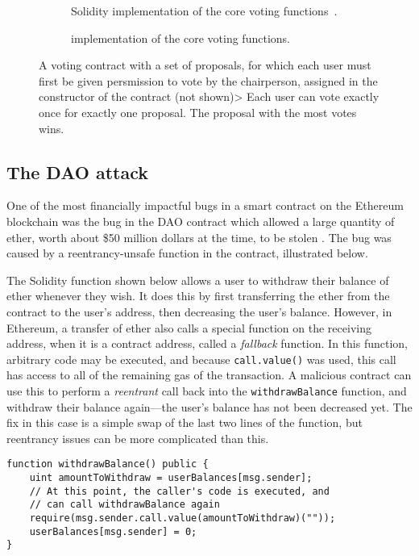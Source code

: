 \documentclass[dvipsnames, usenames, sigconf]{acmart}
\begin{document}
\begin{figure*}[h]
    \centering
    \begin{subfigure}[t]{0.49\textwidth}
        \centering
        
        \caption{Solidity implementation of the core voting functions~\cite{solidityByExample}.}
        \label{fig:voting-impl-sol}
    \end{subfigure}%
    \hfill
    \begin{subfigure}[t]{0.49\textwidth}
        \centering
        
        \caption{\langName implementation of the core voting functions.}
        \label{fig:voting-impl-flow}
    \end{subfigure}
    \caption{A voting contract with a set of proposals, for which each user must first be given persmission to vote by the chairperson, assigned in the constructor of the contract (not shown)>
    Each user can vote exactly once for exactly one proposal.
    The proposal with the most votes wins.}
    \label{fig:voting-impl}
\end{figure*}

\subsection{The DAO attack}
One of the most financially impactful bugs in a smart contract on the Ethereum blockchain was the bug in the DAO contract which allowed a large quantity of ether, worth about \$50 million dollars at the time, to be stolen .
The bug was caused by a reentrancy-unsafe function in the contract, illustrated below.

The Solidity function shown below allows a user to withdraw their balance of ether whenever they wish.
It does this by first transferring the ether from the contract to the user's address, then decreasing the user's balance.
However, in Ethereum, a transfer of ether also calls a special function on the receiving address, when it is a contract address, called a \emph{fallback} function.
In this function, arbitrary code may be executed, and because \lstinline{call.value()} was used, this call has access to all of the remaining gas of the transaction.
A malicious contract can use this to perform a \emph{reentrant} call back into the \lstinline{withdrawBalance} function, and withdraw their balance again---the user's balance has not been decreased yet.
The fix in this case is a simple swap of the last two lines of the function, but reentrancy issues can be more complicated than this.
\begin{lstlisting}[language=Solidity]
function withdrawBalance() public {
    uint amountToWithdraw = userBalances[msg.sender];
    // At this point, the caller's code is executed, and
    // can call withdrawBalance again
    require(msg.sender.call.value(amountToWithdraw)(""));
    userBalances[msg.sender] = 0;
}
\end{lstlisting}
\end{document}
